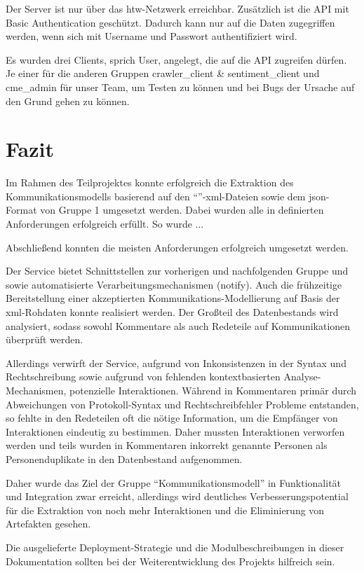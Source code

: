 Der Server ist nur über das \gls{htw}-Netzwerk erreichbar. Zusätzlich ist die API mit
Basic Authentication geschützt. Dadurch kann nur auf die Daten zugegriffen
werden, wenn sich mit Username und Passwort authentifiziert wird.

Es wurden drei Clients, sprich User, angelegt, die auf die API zugreifen
dürfen. Je einer für die anderen Gruppen crawler\_client \& sentiment\_client und
cme\_admin für unser Team, um Testen zu können und bei Bugs der Ursache auf den
Grund gehen zu können.

\section{Fazit}\label{sec:03_05_fazit}

Im Rahmen des Teilprojektes konnte erfolgreich die Extraktion des
Kommunikationsmodells basierend auf den
\enquote{}-\gls{xml}-Dateien sowie dem
\gls{json}-Format von Gruppe 1 umgesetzt werden. Dabei wurden alle in
 definierten Anforderungen erfolgreich erfüllt. So wurde ...

Abschließend konnten die meisten  Anforderungen
erfolgreich umgesetzt werden.

Der Service bietet Schnittstellen zur vorherigen und nachfolgenden Gruppe und
sowie automatisierte Verarbeitungsmechanismen (notify). Auch die frühzeitige
Bereitstellung einer akzeptierten Kommunikations-Modellierung auf Basis der
\gls{xml}-Rohdaten konnte realisiert werden. Der Großteil des Datenbestands wird
analysiert, sodass sowohl Kommentare als auch Redeteile auf Kommunikationen
überprüft werden.

Allerdings verwirft der Service, aufgrund von Inkonsistenzen in der Syntax und
Rechtschreibung sowie aufgrund von fehlenden kontextbasierten
Analyse-Mechanismen, potenzielle Interaktionen. Während in Kommentaren primär durch
Abweichungen von Protokoll-Syntax und Rechtschreibfehler Probleme entstanden,
so fehlte in den Redeteilen oft die nötige Information, um die Empfänger von
Interaktionen eindeutig zu bestimmen. Daher mussten Interaktionen verworfen
werden und teils wurden in Kommentaren inkorrekt genannte Personen als
Personenduplikate in den Datenbestand aufgenommen.

Daher wurde das Ziel der Gruppe \enquote{Kommunikationsmodell} in Funktionalität und
Integration zwar erreicht, allerdings wird deutliches Verbesserungspotential
für die Extraktion von noch mehr Interaktionen und die Eliminierung von
Artefakten gesehen. 

Die ausgelieferte Deployment-Strategie und die Modulbeschreibungen in dieser
Dokumentation sollten bei der Weiterentwicklung des Projekts hilfreich sein.